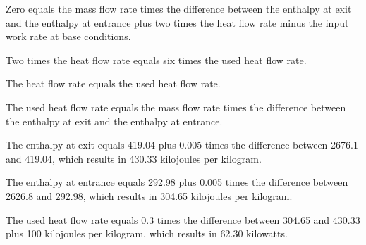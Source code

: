 Zero equals the mass flow rate times the difference between the enthalpy at exit and the enthalpy at entrance plus two times the heat flow rate minus the input work rate at base conditions.

Two times the heat flow rate equals six times the used heat flow rate.

The heat flow rate equals the used heat flow rate.

The used heat flow rate equals the mass flow rate times the difference between the enthalpy at exit and the enthalpy at entrance.

The enthalpy at exit equals 419.04 plus 0.005 times the difference between 2676.1 and 419.04, which results in 430.33 kilojoules per kilogram.

The enthalpy at entrance equals 292.98 plus 0.005 times the difference between 2626.8 and 292.98, which results in 304.65 kilojoules per kilogram.

The used heat flow rate equals 0.3 times the difference between 304.65 and 430.33 plus 100 kilojoules per kilogram, which results in 62.30 kilowatts.